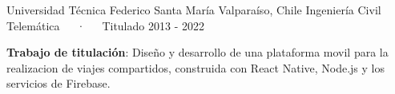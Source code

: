 

\begin{cventries}

  \cventry
    {Universidad Técnica Federico Santa María} %
    {Valparaíso, Chile} %
    {Ingeniería Civil Telemática~~~·~~~Titulado} %
    {2013 - 2022} %
    {
      \begin{cvitems} %
        \item {\textbf{Trabajo de titulación}: Diseño y desarrollo de una plataforma movil para la realizacion de viajes compartidos, construida con React Native, Node.js y los servicios de Firebase.}
      \end{cvitems}
    }

\end{cventries}
